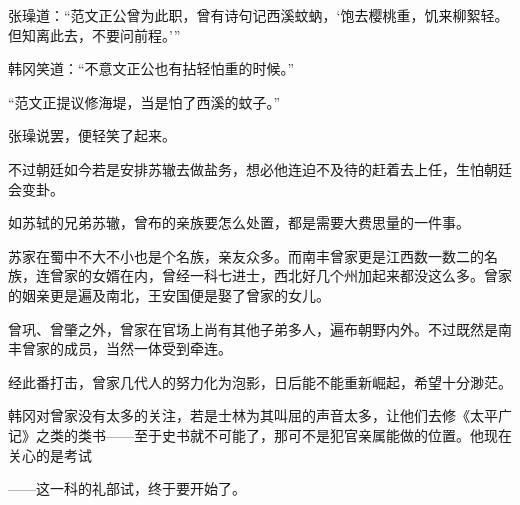 张璪道：“范文正公曾为此职，曾有诗句记西溪蚊蚋，‘饱去樱桃重，饥来柳絮轻。但知离此去，不要问前程。’”

韩冈笑道：“不意文正公也有拈轻怕重的时候。”

“范文正提议修海堤，当是怕了西溪的蚊子。”

张璪说罢，便轻笑了起来。

不过朝廷如今若是安排苏辙去做盐务，想必他连迫不及待的赶着去上任，生怕朝廷会变卦。

如苏轼的兄弟苏辙，曾布的亲族要怎么处置，都是需要大费思量的一件事。

苏家在蜀中不大不小也是个名族，亲友众多。而南丰曾家更是江西数一数二的名族，连曾家的女婿在内，曾经一科七进士，西北好几个州加起来都没这么多。曾家的姻亲更是遍及南北，王安国便是娶了曾家的女儿。

曾巩、曾肇之外，曾家在官场上尚有其他子弟多人，遍布朝野内外。不过既然是南丰曾家的成员，当然一体受到牵连。

经此番打击，曾家几代人的努力化为泡影，日后能不能重新崛起，希望十分渺茫。

韩冈对曾家没有太多的关注，若是士林为其叫屈的声音太多，让他们去修《太平广记》之类的类书——至于史书就不可能了，那可不是犯官亲属能做的位置。他现在关心的是考试

——这一科的礼部试，终于要开始了。

